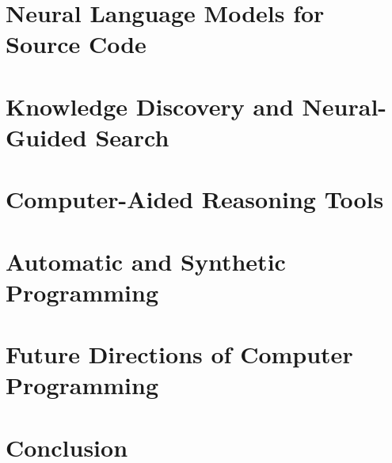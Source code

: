 \documentclass[10pt]{article}
\begin{document}
  \section{Neural Language Models for Source Code}

  \section{Knowledge Discovery and Neural-Guided Search}

  \section{Computer-Aided Reasoning Tools}

  \section{Automatic and Synthetic Programming}

  \section{Future Directions of Computer Programming}

  \section{Conclusion}
\end{document}
